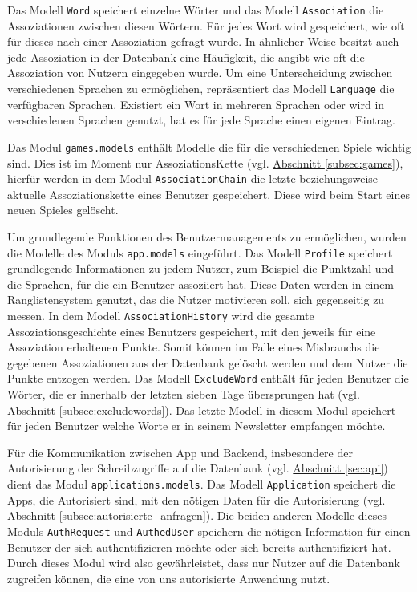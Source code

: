 Das Modell \texttt{Word} speichert einzelne Wörter und das Modell \texttt{Association} die Assoziationen zwischen diesen Wörtern. Für jedes Wort wird gespeichert, wie oft für dieses nach einer Assoziation gefragt wurde. In ähnlicher Weise besitzt auch jede Assoziation in der Datenbank eine Häufigkeit, die angibt wie oft die Assoziation von Nutzern eingegeben wurde.
Um eine Unterscheidung zwischen verschiedenen Sprachen zu ermöglichen, repräsentiert das Modell \texttt{Language} die verfügbaren Sprachen. Existiert ein Wort in mehreren Sprachen oder wird in verschiedenen Sprachen genutzt, hat es für jede Sprache einen eigenen Eintrag.
\newline

Das Modul \texttt{games.models} enthält Modelle die für die verschiedenen Spiele wichtig sind. Dies ist im Moment nur AssoziationsKette (vgl. \hyperref[subsec:games]{Abschnitt \ref*{subsec:games}}), hierfür werden in dem Modul \texttt{AssociationChain} die letzte beziehungsweise aktuelle Assoziationskette eines Benutzer gespeichert. Diese wird beim Start eines neuen Spieles gelöscht.
\newline


Um grundlegende Funktionen des Benutzermanagements zu ermöglichen, wurden die Modelle des Moduls \texttt{app.models} eingeführt. Das Modell \texttt{Profile} speichert grundlegende Informationen zu jedem Nutzer, zum Beispiel die Punktzahl und die Sprachen, für die ein Benutzer assoziiert hat. Diese Daten werden in einem Ranglistensystem genutzt, das die Nutzer motivieren soll, sich gegenseitig zu messen. In dem Modell \texttt{AssociationHistory} wird die gesamte Assoziationsgeschichte eines Benutzers gespeichert, mit den jeweils für eine Assoziation erhaltenen Punkte. Somit können im Falle eines Misbrauchs die gegebenen Assoziationen aus der Datenbank gelöscht werden und dem Nutzer die Punkte entzogen werden.
Das Modell \texttt{ExcludeWord} enthält für jeden Benutzer die Wörter, die er innerhalb der letzten sieben Tage übersprungen hat (vgl. \hyperref[subsec:excludewords]{Abschnitt \ref*{subsec:excludewords}}). Das letzte Modell in diesem Modul speichert für jeden Benutzer welche Worte er in seinem Newsletter empfangen möchte.
\newline

Für die Kommunikation zwischen App und Backend, insbesondere der Autorisierung der Schreibzugriffe auf die Datenbank (vgl. \hyperref[sec:api]{Abschnitt \ref*{sec:api}}) dient das Modul \texttt{applications.models}. Das Modell \texttt{Application} speichert die Apps, die Autorisiert sind, mit den nötigen Daten für die Autorisierung (vgl. \hyperref[subsec:autorisierte_anfragen]{Abschnitt \ref*{subsec:autorisierte_anfragen}}). Die beiden anderen Modelle dieses Moduls \texttt{AuthRequest} und \texttt{AuthedUser} speichern die nötigen Information für einen Benutzer der sich authentifizieren möchte oder sich bereits authentifiziert hat. Durch dieses Modul wird also gewährleistet, dass nur Nutzer auf die Datenbank zugreifen können, die eine von uns autorisierte Anwendung nutzt.
\newline

